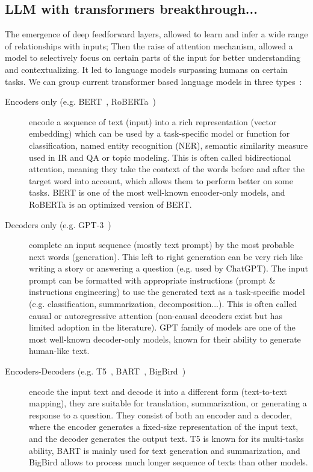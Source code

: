 \documentclass[acmsmall]{acmart}
\begin{document}
\subsection{LLM with transformers breakthrough...}
The emergence of deep feedforward layers, allowed to learn and infer a wide range of relationships with inputs; Then the raise of attention mechanism, allowed a model to selectively focus on certain parts of the input for better understanding and contextualizing. It led to language models surpassing humans on certain tasks. We can group current transformer based language models in three types~\citep{lewisNaturalLanguageProcessing2022}:
\begin{description}
    \item [Encoders only (e.g. BERT~\citep{devlinBERTPretrainingDeep2019}, RoBERTa~\citep{liuRoBERTaRobustlyOptimized2019})] encode a sequence of text (input) into a rich representation (vector embedding) which can be used by a task-specific model or function for classification, named entity recognition (NER), semantic similarity measure used in IR and QA or topic modeling. This is often called bidirectional attention, meaning they take the context of the words before and after the target word into account, which allows them to perform better on some tasks. BERT is one of the most well-known encoder-only models, and RoBERTa is an optimized version of BERT.
    \item [Decoders only (e.g. GPT-3~\citep{zongSurveyGPT32022})] complete an input sequence (mostly text prompt) by the most probable next words (generation). This left to right generation can be very rich like writing a story or answering a question (e.g. used by ChatGPT). The input prompt can be formatted with appropriate instructions (prompt \& instructions engineering) to use the generated text as a task-specific model (e.g. classification, summarization, decomposition...). This is often called causal or autoregressive attention (non-causal decoders exist but has limited adoption in the literature). GPT family of models are one of the most well-known decoder-only models, known for their ability to generate human-like text.
    \item [Encoders-Decoders (e.g. T5~\citep{raffelExploringLimitsTransfer2020}, BART~\citep{lewisBARTDenoisingSequencetoSequence2019}, BigBird~\citep{zaheerBigBirdTransformers2021})] encode the input text and decode it into a different form (text-to-text mapping), they are suitable for translation, summarization, or generating a response to a question. They consist of both an encoder and a decoder, where the encoder generates a fixed-size representation of the input text, and the decoder generates the output text. T5 is known for its multi-tasks ability, BART is mainly used for text generation and summarization, and BigBird allows to process much longer sequence of texts than other models.
\end{description}
\end{document}
